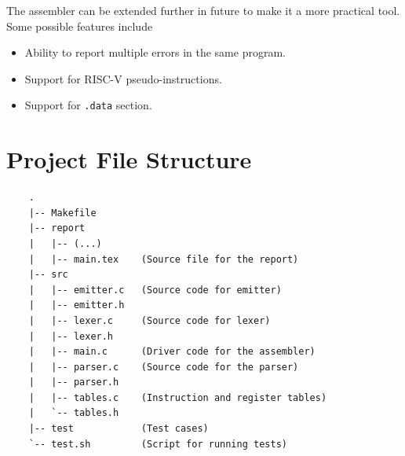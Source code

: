 \documentclass{article}
\begin{document}
The assembler can be extended further in future to make it a more 
practical tool. Some possible features include
\begin{itemize}
    \item Ability to report multiple errors in the same program.
    \item Support for RISC-V pseudo-instructions.
    \item Support for \texttt{.data} section.
\end{itemize}

\section{Project File Structure}

\begin{verbatim}
    .
    |-- Makefile
    |-- report
    |   |-- (...)
    |   |-- main.tex    (Source file for the report)
    |-- src
    |   |-- emitter.c   (Source code for emitter)
    |   |-- emitter.h
    |   |-- lexer.c     (Source code for lexer)
    |   |-- lexer.h
    |   |-- main.c      (Driver code for the assembler)
    |   |-- parser.c    (Source code for the parser)
    |   |-- parser.h
    |   |-- tables.c    (Instruction and register tables)
    |   `-- tables.h
    |-- test            (Test cases)
    `-- test.sh         (Script for running tests)
\end{verbatim}
\end{document}
